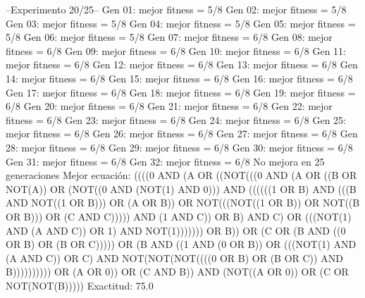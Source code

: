 --Experimento 
 20/25--
Gen 01: mejor fitness = 5/8
Gen 02: mejor fitness = 5/8
Gen 03: mejor fitness = 5/8
Gen 04: mejor fitness = 5/8
Gen 05: mejor fitness = 5/8
Gen 06: mejor fitness = 5/8
Gen 07: mejor fitness = 6/8
Gen 08: mejor fitness = 6/8
Gen 09: mejor fitness = 6/8
Gen 10: mejor fitness = 6/8
Gen 11: mejor fitness = 6/8
Gen 12: mejor fitness = 6/8
Gen 13: mejor fitness = 6/8
Gen 14: mejor fitness = 6/8
Gen 15: mejor fitness = 6/8
Gen 16: mejor fitness = 6/8
Gen 17: mejor fitness = 6/8
Gen 18: mejor fitness = 6/8
Gen 19: mejor fitness = 6/8
Gen 20: mejor fitness = 6/8
Gen 21: mejor fitness = 6/8
Gen 22: mejor fitness = 6/8
Gen 23: mejor fitness = 6/8
Gen 24: mejor fitness = 6/8
Gen 25: mejor fitness = 6/8
Gen 26: mejor fitness = 6/8
Gen 27: mejor fitness = 6/8
Gen 28: mejor fitness = 6/8
Gen 29: mejor fitness = 6/8
Gen 30: mejor fitness = 6/8
Gen 31: mejor fitness = 6/8
Gen 32: mejor fitness = 6/8
No mejora en 25 generaciones
Mejor ecuación: ((((0 AND (A OR ((NOT(((0 AND (A OR ((B OR NOT(A)) OR (NOT((0 AND (NOT(1) AND 0))) AND ((((((1 OR B) AND (((B AND NOT((1 OR B))) OR (A OR B)) OR NOT(((NOT((1 OR B)) OR NOT((B OR B))) OR (C AND C))))) AND (1 AND C)) OR B) AND C) OR (((NOT(1) AND (A AND C)) OR 1) AND NOT(1))))))) OR B)) OR (C OR (B AND ((0 OR B) OR (B OR C))))) OR (B AND ((1 AND (0 OR B)) OR (((NOT(1) AND (A AND C)) OR C) AND NOT(NOT(NOT((((0 OR B) OR (B OR C)) AND B)))))))))) OR (A OR 0)) OR (C AND B)) AND (NOT((A OR 0)) OR (C OR NOT(NOT(B)))))
 Exactitud: 75.0%

